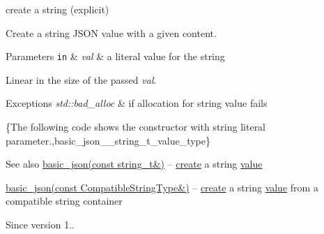 create a string (explicit) 

Create a string J\+S\+ON value with a given content.


\begin{DoxyParams}[1]{Parameters}
\mbox{\tt in}  & {\em val} & a literal value for the string\\
\hline
\end{DoxyParams}
Linear in the size of the passed {\itshape val}.


\begin{DoxyExceptions}{Exceptions}
{\em std\+::bad\+\_\+alloc} & if allocation for string value fails\\
\hline
\end{DoxyExceptions}
\{The following code shows the constructor with string literal parameter.,basic\+\_\+json\+\_\+\+\_\+string\+\_\+t\+\_\+value\+\_\+type\}

\begin{DoxySeeAlso}{See also}
\hyperlink{classnlohmann_1_1basic__json_ab8b43d92a042dde96c28aeea81dd52de}{basic\+\_\+json(const string\+\_\+t\&)} -- \hyperlink{classnlohmann_1_1basic__json_afdb7a485369fbfd8c4c7c134ebb1feb5}{create} a string \hyperlink{classnlohmann_1_1basic__json_a407e73a037e6e3067ef7aa2c25a79f39}{value} 

\hyperlink{classnlohmann_1_1basic__json_ae85d91b0620650bcd9993e09d0e287d9}{basic\+\_\+json(const Compatible\+String\+Type\&)} -- \hyperlink{classnlohmann_1_1basic__json_afdb7a485369fbfd8c4c7c134ebb1feb5}{create} a string \hyperlink{classnlohmann_1_1basic__json_a407e73a037e6e3067ef7aa2c25a79f39}{value} from a compatible string container
\end{DoxySeeAlso}
\begin{DoxySince}{Since}
version 1.. 
\end{DoxySince}
\hypertarget{classnlohmann_1_1basic__json_ae85d91b0620650bcd9993e09d0e287d9}{}\label{classnlohmann_1_1basic__json_ae85d91b0620650bcd9993e09d0e287d9} 
